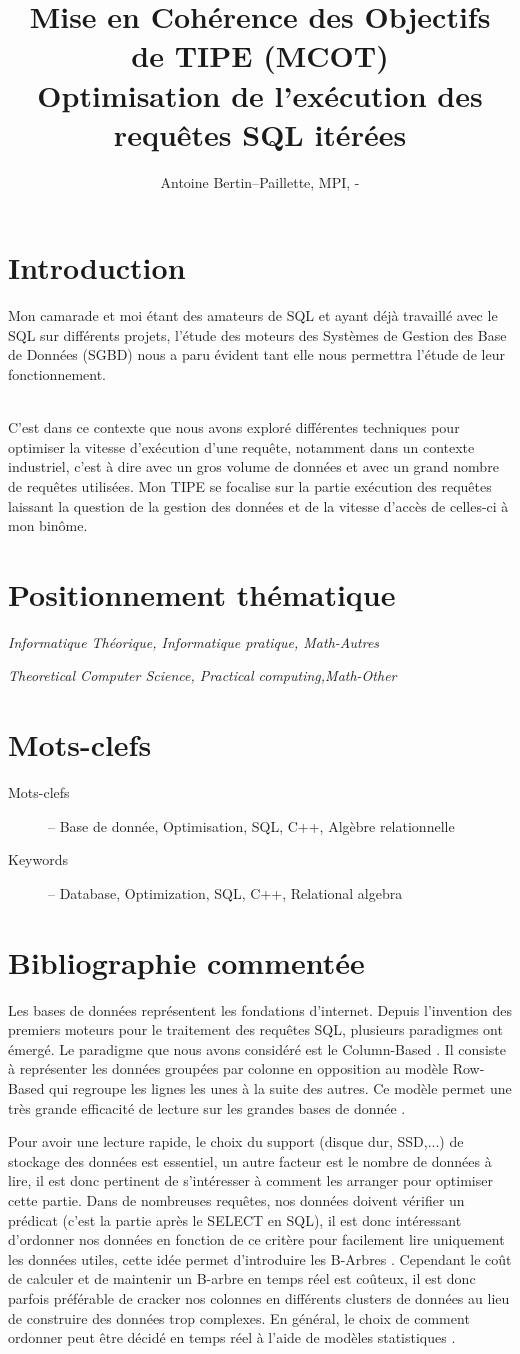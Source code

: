 \documentclass[12pt,a4paper]{article}
\title{Mise en Cohérence des Objectifs de TIPE (MCOT) \\Optimisation de l'exécution des requêtes SQL itérées}
\author{Antoine Bertin--Paillette, MPI, \arabic{byear}-\the\year }
\newcommand{\positionnementThematique}[2]{
\section*{Positionnement thématique}
{\it #1\par\it #2}
}
\newcommand{\motclefs}[2]{
\section*{Mots-clefs}
\begin{description}
\item[Mots-clefs] -- #1 
\item[Keywords]   -- #2
\end{description}
}
\begin{document}
\maketitle

\section*{Introduction}
Mon camarade et moi étant des amateurs de SQL et ayant déjà travaillé avec le SQL sur différents projets, l’étude des moteurs des Systèmes de Gestion des Base de Données (SGBD) nous a paru évident tant elle nous permettra l'étude de leur fonctionnement.
\\
\\
\par C'est dans ce contexte que nous avons exploré différentes techniques pour optimiser la vitesse d'exécution d'une requête, notamment dans un contexte industriel, c'est à dire avec un gros volume de données et avec un grand nombre de requêtes utilisées. Mon TIPE se focalise sur la partie exécution des requêtes laissant la question de la gestion des données et de la vitesse d'accès de celles-ci à mon binôme.



\positionnementThematique{Informatique Théorique, Informatique pratique, Math-Autres}{Theoretical Computer Science, Practical computing,Math-Other}

\motclefs{Base de donnée, Optimisation, SQL, C++, Algèbre relationnelle }{Database, Optimization, SQL, C++, Relational algebra}


\section*{Bibliographie commentée}
Les bases de données représentent les fondations d'internet. Depuis l'invention des premiers moteurs pour le traitement des requêtes SQL, plusieurs paradigmes ont émergé. Le paradigme que nous avons considéré est le Column-Based \cite{abadi_design_2013}. Il consiste à représenter les données groupées par colonne en opposition au modèle Row-Based qui regroupe les lignes les unes à la suite des autres. Ce modèle permet une très grande efficacité de lecture sur les grandes bases de donnée \cite{abadi_zstonebraker_c_store_2005}.


Pour avoir une lecture rapide, le choix du support (disque dur, SSD,...) de stockage des données est essentiel, un autre facteur est le nombre de données à lire, il est donc pertinent de s'intéresser à comment les arranger pour optimiser cette partie. Dans de nombreuses requêtes, nos données doivent vérifier un prédicat (c'est la partie après le SELECT en SQL), il est donc intéressant d'ordonner nos données en fonction de ce critère pour facilement lire uniquement les données utiles, cette idée permet d'introduire les B-Arbres \cite{abadi_design_2013}. Cependant le coût de calculer et de maintenir un B-arbre en temps réel est coûteux, il est donc parfois préférable de cracker nos colonnes en différents clusters de données au lieu de construire des données trop complexes. En général, le choix de comment ordonner peut être décidé en temps réel à l'aide de modèles statistiques \cite{rouvroy_hypothetical_nodate}. 
\end{document}
